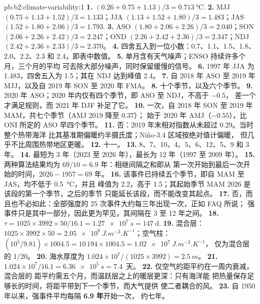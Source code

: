 \begin{solution}{pb:b2:climate-variability:1}
\textbf{1.} $(0.26 + 0.75 + 1.13)/3 = \qty{0.713}{\celsius}$.
\textbf{2.} MJJ $(0.75 + 1.13 + 1.52)/3 = 1.133$；JJA $(1.13 + 1.52 + 1.80)/3 = 1.483$；JAS $(1.52 +
1.80 + 2.06)/3 = 1.793$.
\textbf{3.} ASO $(1.80 + 2.06 + 2.26)/3 = 2.040$；SON $(2.06 + 2.26 + 2.42)/3 = 2.247$；OND $(2.26
+ 2.42 + 2.36)/3 = 2.347$；NDJ $(2.42 + 2.36 + 2.33)/3 = 2.370$。
\textbf{4.} 四舍五入到一位小数：0.7、1.1、1.5、1.8、2.0、2.2、2.3 和 2.4，即表中数值。
\textbf{5.} 单月含有天气噪声；ENSO 持续许多个月，三个月的平均
可去除大部分噪声，同时保留缓慢的信号。
\textbf{6.} 1997 年 JJA 为 1.483，四舍五入为 1.5；其在 NDJ 达到峰值 2.4。
\textbf{7.} 自 2018 年 ASO 至 2019 年 MJJ，以及自 2019 年 SON 至 2020 年 FMA。
\textbf{8.} 十个季节，以及六个季节。
\textbf{9.} 2020 年 ASO；2020 年内仅有四个季节，即 ASO 至 NDJ，不高于 $-0.5$，
差一个才满足规则，而 2021 年 DJF 补足了它。
\textbf{10.} 一次，自 2018 年 SON 至 2019 年 MAM，共七个季节（AMJ 2019 降至 0.37）；
始于 2020 年 AMJ（$-0.55$），比 ONI 所定的 ASO 早四个季节。
\textbf{11.} 否：2019 年末相对指数从未超过 0.29。当时整个热带海洋
比其基准期偏暖约半摄氏度；Niño-3.4 区域按绝对值计偏暖，
但几乎不比周围热带地区更暖。
\textbf{12.} 十一。
\textbf{13.} 8、7、10、4、5、6、12、5、9 和 3 年。
\textbf{14.} 最短为 3 年（2023 至 2026 年），最长为 12 年（1997 至 2009 年）。
\textbf{15.} 两种算法结果均为 $69/10 = 6.9$ 年：相继间隔之和即从
第一次开始到最后一次开始的时间，$2026 - 1957 = 69$ 年。
\textbf{16.} 该事件已持续五个季节，即自 MAM 至 JAS，均不低于 \qty{0.5}{\celsius}，并且
峰值为 2.2，高于 1.5；其起始季节 MAM 2026 是该段的第一个季节，之后的季节
只能延长该段，而不能改变其起点。
\textbf{17.} 否，而且也不必如此：全部强度的 25 次事件大约每三年出现一次，正如 FAQ 所说；
强事件只是其中一部分，因此更为罕见，其间隔在 3 至 12 年之间。
\textbf{18.} $\tau = 1025 \times 3992 \times 50/16.1 = \qty{1.27e7}{s} = \qty{147}{\day}$.
\textbf{19.} 混合层：$1025 \times 3992 \times 50 = \qty{2.05e8}{J.m^{-2}.K^{-1}}$；空气柱：
$(10^5/9.81) \times 1004.5 = 10\,194 \times 1004.5 = \qty{1.02e7}{J.m^{-2}.K^{-1}}$，
仅为混合层的 1/20。
\textbf{20.} 海水厚度为 $1.024 \times 10^7/(1025 \times 3992) = \qty{2.5}{m}$。
\textbf{21.} $1.024 \times 10^7/16.1 = \qty{6.36e5}{s} = 7.4$~天。
\textbf{22.} 仅空气的距平约在一周内衰减，混合层的
距平约需五个月，而温跃层之上的暖层更深：只有海洋能
把热量保存足够长的时间，将距平带到下一个季节，而大气提供
使二者耦合的风。
\textbf{23.} 自 1950 年以来，强事件平均每隔 \textbf{6.9 年}开始一次，
约七年。
\end{solution}
